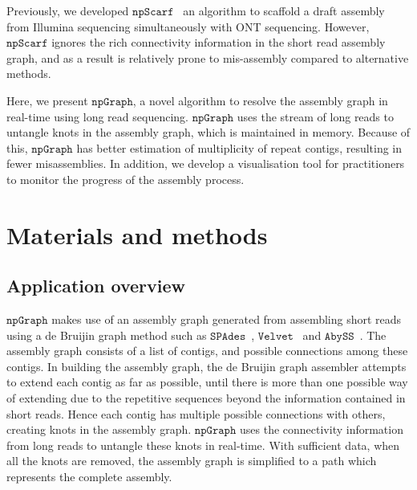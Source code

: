 \documentclass[10pt,letterpaper]{article}
\newcommand{\npscarf}{$\mathtt{npScarf}$}
\newcommand{\npgraph}{$\mathtt{npGraph}$}
\newcommand{\spades}{$\mathtt{SPAdes}$}
\begin{document}
Previously, we developed \npscarf{}~\cite{Cao2017scaffolding} an algorithm to scaffold a draft assembly from Illumina sequencing simultaneously with ONT sequencing.  However, \npscarf{} ignores the rich connectivity information in the short read assembly graph, and as a result is relatively prone to mis-assembly compared to alternative methods.

Here, we present \npgraph{}, a novel algorithm to resolve the assembly graph in real-time using long read 
sequencing. \npgraph{} uses the stream of long reads to untangle knots in the assembly graph, which is maintained in memory.
Because of this, \npgraph{} has better estimation of multiplicity of repeat contigs, resulting in fewer misassemblies. 
In addition, we develop a visualisation tool for practitioners to monitor
the progress of the assembly process.


\section*{Materials and methods}
\subsection*{Application overview}
\npgraph{} makes use of an assembly graph generated from assembling short reads using a de Bruijin
graph method such as \spades{}~\cite{BankevichNA2012}, $\mathtt{Velvet}$~\cite{Zerbino2008}
and $\mathtt{AbySS}$~\cite{Simpson2009}. The assembly graph consists of a list of contigs, and 
possible connections among these contigs. In building the assembly graph, the de Bruijin graph assembler attempts to extend 
each contig as far as possible, until there is more than one possible way of extending due to the repetitive sequences 
beyond the information contained in short reads. Hence each contig has multiple possible connections with others,
 creating knots in the assembly graph. \npgraph{}  uses the connectivity information from long reads to untangle these knots in real-time. 
 With sufficient data, when all the knots are removed, the assembly graph is simplified 
to a path which represents the complete assembly.

\end{document}

